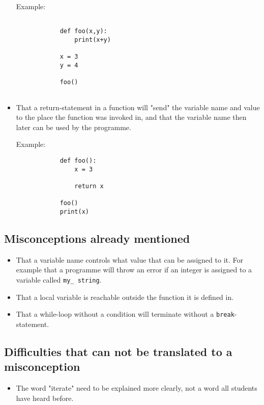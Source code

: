\begin{itemize}
        Example:

        \begin{verbatim}

            def foo(x,y):
                print(x+y)

            x = 3
            y = 4

            foo()
            
        \end{verbatim}

        \item That a return-statement in a function will "send" the 
variable name and value to the place the function was invoked in, 
and that the variable name then later can be used by the programme.

        Example:
        \hfill
        \begin{verbatim}
            def foo():
                x = 3
    
                return x
    
            foo()
            print(x)
        \end{verbatim}
    \end{itemize}

\subsection{Misconceptions already mentioned}

    \begin{itemize}
        \item That a variable name controls what value that can be assigned 
to it. For example that a programme will throw an error if an 
integer is assigned to a variable called \texttt{my_
string}.
        \item That a local variable is reachable outside the function it is 
defined in.
        \item That a while-loop without a condition will terminate without 
a \texttt{break}-statement.
        

        
    \end{itemize}

\subsection{Difficulties that can not be translated to a misconception}

\begin{itemize}
    \item The word "iterate" need to be explained more clearly, not a word 
all students have heard before. 
\end{itemize}